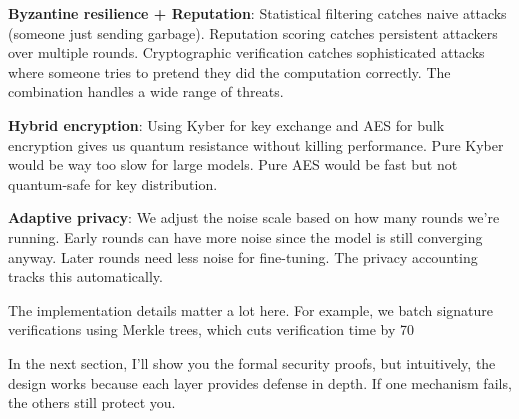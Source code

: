\documentclass[journal]{IEEEtran}
\begin{document}
\textbf{Byzantine resilience + Reputation}: Statistical filtering catches naive attacks (someone just sending garbage). Reputation scoring catches persistent attackers over multiple rounds. Cryptographic verification catches sophisticated attacks where someone tries to pretend they did the computation correctly. The combination handles a wide range of threats.

\textbf{Hybrid encryption}: Using Kyber for key exchange and AES for bulk encryption gives us quantum resistance without killing performance. Pure Kyber would be way too slow for large models. Pure AES would be fast but not quantum-safe for key distribution.

\textbf{Adaptive privacy}: We adjust the noise scale based on how many rounds we're running. Early rounds can have more noise since the model is still converging anyway. Later rounds need less noise for fine-tuning. The privacy accounting tracks this automatically.

The implementation details matter a lot here. For example, we batch signature verifications using Merkle trees, which cuts verification time by 70%

In the next section, I'll show you the formal security proofs, but intuitively, the design works because each layer provides defense in depth. If one mechanism fails, the others still protect you.
\end{document}
